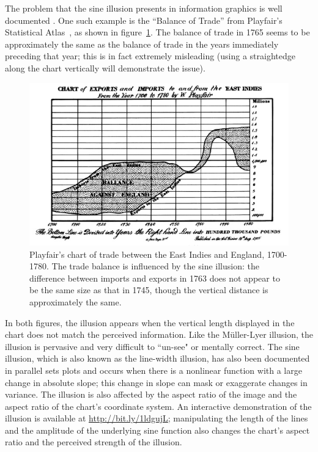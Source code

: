 \documentclass[11pt]{isuthesis}\usepackage[]{graphicx}\usepackage[]{color}
\begin{document}
The problem that the sine illusion presents in information graphics is well documented \citep{cleveland:1984, robbins:2005}. One such example is the ``Balance of Trade'' from Playfair's Statistical Atlas~\citep{playfair}, as shown in figure~\ref{fig:playfair}. The balance of trade in 1765 seems to be approximately the same as the balance of trade in the years immediately preceding that year; this is in fact extremely misleading (using a straightedge along the chart vertically will demonstrate the issue).%



\begin{figure}[t]\centering
\includegraphics[keepaspectratio=TRUE,width=5in]{PlayfairExportImports}
\caption[The balance of trade between the East Indies and England, 1700-1780]{Playfair's chart of trade between the East Indies and England, 1700-1780. The trade balance is influenced by the sine illusion: the difference between imports and exports in 1763 does not appear to be the same size as that in 1745, though the vertical distance is approximately the same.}\label{fig:playfair}
\end{figure}

In both figures, the illusion appears when the vertical length displayed in the chart does not match the perceived information. Like the M\"uller-Lyer illusion, the illusion is pervasive and very difficult to ``un-see" or mentally correct. The sine illusion, which is also known as the line-width illusion, has also been documented in parallel sets plots \citep{parallelsets} and occurs when there is a nonlinear function with a large change in absolute slope; this change in slope can mask or exaggerate changes in variance. The illusion is also affected by the aspect ratio of the image and the aspect ratio of the chart's coordinate system. An interactive demonstration of the illusion is available at \url{http://bit.ly/1ldgujL}; manipulating the length of the lines and the amplitude of the underlying sine function also changes the chart's aspect ratio and the perceived strength of the illusion. 
\end{document}
